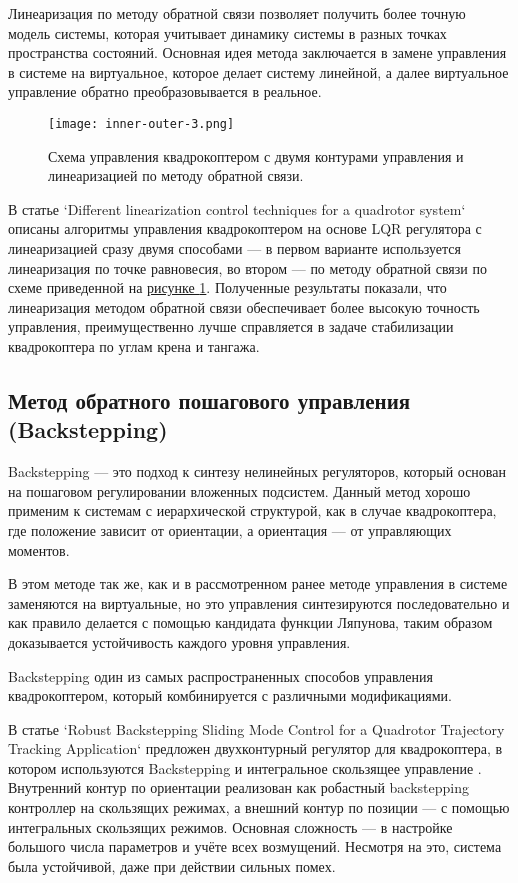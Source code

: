 Линеаризация по методу обратной связи позволяет получить более точную модель системы, которая учитывает динамику системы в
разных точках пространства состояний. Основная идея метода заключается в 
замене управления в системе на виртуальное, которое делает систему линейной, а далее виртуальное управление обратно преобразовывается в реальное.

\begin{figure}[ht]
    \centering
    \texttt{[image: inner-outer-3.png]}
    \caption{Схема управления квадрокоптером с двумя контурами управления и линеаризацией по методу обратной связи.}
    \label{fig:inner-outer-2}
\end{figure}

В статье 
`Different linearization control techniques for a quadrotor system`
описаны алгоритмы управления квадрокоптером на основе LQR регулятора с линеаризацией сразу двумя способами —
в первом варианте используется линеаризация по точке равновесия, во втором — по методу обратной связи по схеме приведенной
на \hyperref[fig:point-rot]{рисунке \ref*{fig:inner-outer-2}}\cite{LQR_feedback}. 
Полученные результаты 
показали, что линеаризация методом обратной связи обеспечивает более высокую точность управления, преимущественно 
лучше справляется в задаче стабилизации квадрокоптера по углам крена и тангажа.

\subsection{Метод обратного пошагового управления (Backstepping)}

Backstepping — это подход к синтезу нелинейных регуляторов, 
который основан на пошаговом регулировании вложенных подсистем. 
Данный метод хорошо применим к системам с иерархической структурой, 
как в случае квадрокоптера, где положение зависит от ориентации, а ориентация — от управляющих моментов.

В этом методе так же, как и в рассмотренном ранее методе управления в системе заменяются на виртуальные, но 
это управления синтезируются последовательно и как правило делается с помощью кандидата функции Ляпунова, таким 
образом доказывается устойчивость каждого уровня управления.

Backstepping один из самых распространенных способов управления квадрокоптером, который комбинируется с различными модификациями.

В статье `Robust Backstepping Sliding Mode
Control for a Quadrotor Trajectory
Tracking Application` предложен двухконтурный регулятор для квадрокоптера, 
в котором используются Backstepping и интегральное скользящее управление \cite{RobustSlidingMode}. 
Внутренний контур по ориентации реализован как робастный backstepping контроллер на скользящих режимах, 
а внешний контур по позиции — с помощью интегральных скользящих режимов.
Основная сложность — в настройке большого числа параметров и учёте всех возмущений. 
Несмотря на это, система была устойчивой, даже при действии сильных помех.

